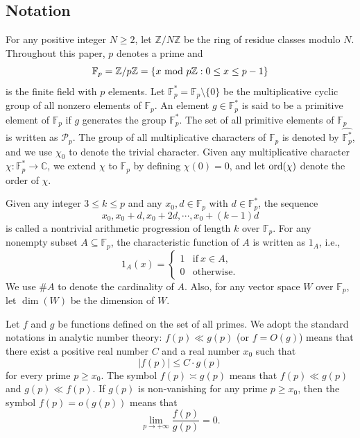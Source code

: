 \documentclass[12pt]{amsart}
\def\ord{{\rm ord}}
\def\mod #1{\ {\rm mod}\ #1}
\theoremstyle{plain}
\theoremstyle{remark}
\begin{document}
	\subsection{Notation} For any positive integer $N\ge2$, let $\mathbb{Z}/N\mathbb{Z}$ be the ring of residue classes modulo $N$. Throughout this paper, $p$ denotes a prime and 
	$$\mathbb{F}_p=\mathbb{Z}/p\mathbb{Z}=\{x\mod{p\mathbb{Z}}: 0\le x\le p-1\}$$ 
	is the finite field with $p$ elements. Let $\mathbb{F}_p^*=\mathbb{F}_p\setminus\{0\}$ be the multiplicative cyclic group of all nonzero elements of $\mathbb{F}_p$. An element $g\in\mathbb{F}_p^*$ is said to be a primitive element of $\mathbb{F}_p$ if $g$ generates the group $\mathbb{F}_p^*$. The set of all primitive elements of $\mathbb{F}_p$ is written as $\mathcal{P}_p$. The group of all multiplicative characters of $\mathbb{F}_p$ is denoted by $\widehat{\mathbb{F}_p^*}$, and we use $\chi_0$ to denote the trivial character. Given any multiplicative character $\chi: \mathbb{F}_p^*\rightarrow\mathbb{C}$, we extend $\chi$ to $\mathbb{F}_p$ by defining $\chi(0)=0$, and let $\ord(\chi)$ denote the order of $\chi$. 
	
	Given any integer $3\le k\le p$ and any $x_0,d\in\mathbb{F}_p$ with $d\in\mathbb{F}_p^*$, the sequence 
	$$x_0,x_0+d,x_0+2d,\cdots,x_0+(k-1)d$$
	is called a nontrivial arithmetic progression of length $k$ over $\mathbb{F}_p$. For any nonempty  subset $A\subseteq\mathbb{F}_p$, the characteristic function of $A$ is written as $1_A$, i.e., 
	$$1_A(x)=\begin{cases}
		1 & \mbox{if}\ x\in A,\\
		0 & \mbox{otherwise}.
	\end{cases}$$
	We use $\#A$ to denote the cardinality of $A$. Also, for any vector space $W$ over $\mathbb{F}_p$, let $\dim(W)$ be the dimension of $W$. 
	
	Let $f$ and $g$ be functions defined on the set of all primes. We adopt the standard notations in analytic number theory: $f(p)\ll g(p)$ (or $f=O(g)$) means that there exist a positive real number $C$ and a real number $x_0$ such that 
	$$|f(p)|\le C\cdot g(p)$$
	for every prime $p\ge x_0$. The symbol $f(p)\asymp g(p)$ means that $f(p)\ll g(p)$ and $g(p)\ll f(p)$. If $g(p)$ is non-vanishing for any prime $p\ge x_0$, then the symbol $f(p)=o(g(p))$ means that 
	$$\lim_{p\to+\infty}\frac{f(p)}{g(p)}=0.$$
	
\end{document}
